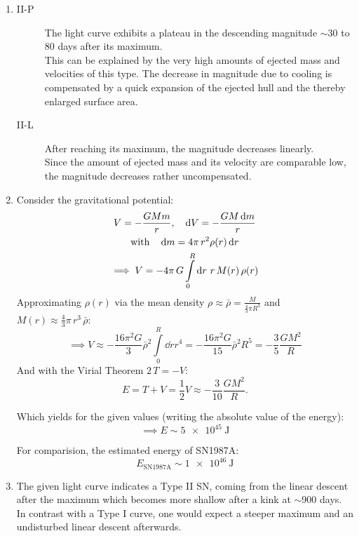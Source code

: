 \documentclass[11pt,a4paper]{scrartcl}
\begin{document}
\begin{enumerate}[label=\textbf{\large(\alph*)}, itemsep=\baselineskip]
\item
    \begin{description}
        \item[II-P] The light curve exhibits a plateau in the descending
            magnitude $\sim$30 to 80 days after its maximum. \\
            This can be explained by the very high amounts of ejected mass and
            velocities of this type. The decrease in magnitude due to cooling
            is compensated by a quick expansion of the ejected hull and the
            thereby enlarged surface area.
        \item[II-L] After reaching its maximum, the magnitude decreases
            linearly. \\
            Since the amount of ejected mass and its velocity are comparable
            low, the magnitude decreases rather uncompensated.
    \end{description}


\item
    Consider the gravitational potential:
    \begin{gather*}
        V=-\frac{GMm}{r}\qc\dd{V}=-\frac{GM\dd{m}}{r} \\
        \qq*{with}\dd{m}=4\pi\,r^2\rho(r)\dd{r} \\
        \implies V=-4\pi\,G\int\limits_{0}^{R}\dd{r}\,r\,M(r)\,\rho(r)
    \end{gather*}
    Approximating $\rho(r)$ via the mean density
    $\rho\approx\bar{\rho}=\frac{M}{\frac{4}{3}\pi{R}^{3}}$ and
    $M(r)\approx\frac{4}{3}\pi\,r^3\,\bar{\rho}$:
    \begin{equation*}
        \implies V\approx-\frac{16\pi^2G}{3}\bar{\rho}^2\int\limits_{0}^{R}\dd{r}r^4
        =-\frac{16\pi^2G}{15}\bar{\rho}^2R^5
        =-\frac{3}{5}\frac{GM^2}{R}
    \end{equation*}
    And with the Virial Theorem $2\,T=-V$:
    \begin{equation*}
        E=T+V=\frac{1}{2}V\approx-\frac{3}{10}\frac{GM^2}{R}.
    \end{equation*}

    Which yields for the given values (writing the absolute value of the
    energy):
    \begin{equation*}
        \implies E\sim\SI{5e45}{\joule}
    \end{equation*}

    For comparision, the estimated energy of SN1987A:
    \begin{equation*}
        E_{\mathrm{SN1987A}}\sim\SI{1e46}{\joule}
    \end{equation*}


\item
    The given light curve indicates a Type II SN, coming from the linear
    descent after the maximum which becomes more shallow after a kink at
    $\sim$900 days.  In contrast with a Type I curve, one would expect a steeper
    maximum and an undisturbed linear descent afterwards.

\end{enumerate}
\end{document}
